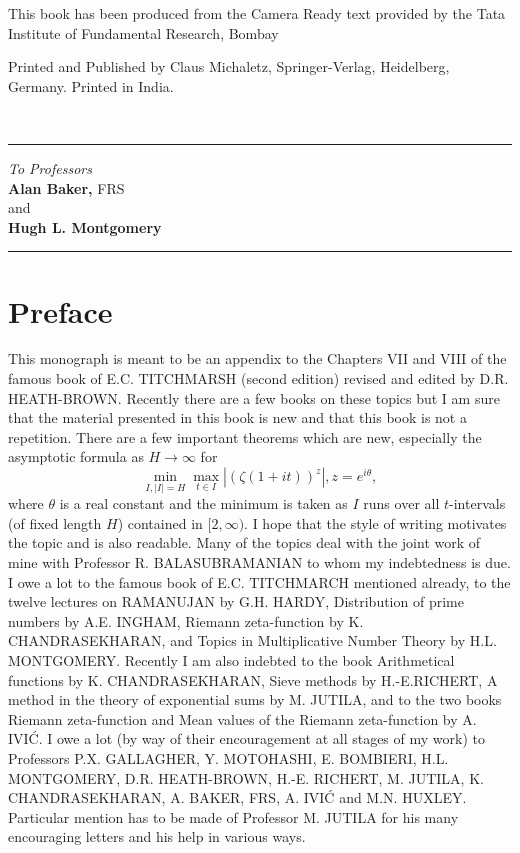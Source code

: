 \noindent
This book has been produced from the Camera
Ready text provided by the 
Tata Institute of Fundamental Research, Bombay  


\noindent
Printed and Published by Claus Michaletz,
Springer-Verlag, Heidelberg, Germany. Printed in India.  

\eject

\thispagestyle{empty}
~
\vfill

\begin{center}

\noindent\rule{\textwidth}{1pt}

\textit{To Professors}\\[5pt]
{\large\bf Alan Baker,} FRS\\
and\\
{\large\bf Hugh L. Montgomery}

\noindent\rule{\textwidth}{1pt}
\vfill

\end{center}


\chapter{Preface}

This monograph is meant to be an appendix to the Chapters VII and VIII of the famous book of E.C. TITCHMARSH (second edition) revised and edited by D.R. HEATH-BROWN. Recently there are a few books on these topics but I am sure that the material presented in this book is new and that this book is not a repetition. There are a few important theorems which are new, especially the asymptotic formula as $H \to \infty$ for
$$
\min\limits_{I,|I| = H} \max\limits_{t \in I} |(\zeta (1+ it))^z|, z = e^{i\theta},
$$
where $\theta$ is a real constant and the minimum is taken as $I$ runs over all $t$-intervals (of fixed length $H$) contained in $[2, \infty)$. I hope that the style of writing motivates the topic and is also readable. Many of the topics deal with  the joint work of mine with Professor R. BALASUBRAMANIAN to whom my indebtedness is due. I owe a lot to the famous book of E.C. TITCHMARCH mentioned already, to the twelve lectures on RAMANUJAN by G.H. HARDY, Distribution of prime numbers by A.E. INGHAM, Riemann zeta-function by K. CHANDRASEKHARAN, and Topics in Multiplicative Number Theory by H.L. MONTGOMERY. Recently I am also indebted to the book Arithmetical functions by K. CHANDRASEKHARAN, Sieve methods by H.-E.\break RICHERT, A method in the theory of exponential sums by M. JUTILA, and to the two books Riemann zeta-function and Mean values of the Riemann zeta-function by A. IVI\'C. I owe a lot (by way  of their encouragement at all stages of my work) to Professors P.X. GALLAGHER, Y. MOTOHASHI, E. BOMBIERI, H.L. MONTGOMERY, D.R. HEATH-BROWN, H.-E. RICHERT, M. JUTILA, K. CHANDRASEKHARAN, A. BAKER, FRS, A. IVI\'C and M.N. HUXLEY. Particular mention has to be made of Professor M. JUTILA for his many encouraging letters and his help in various ways.    

